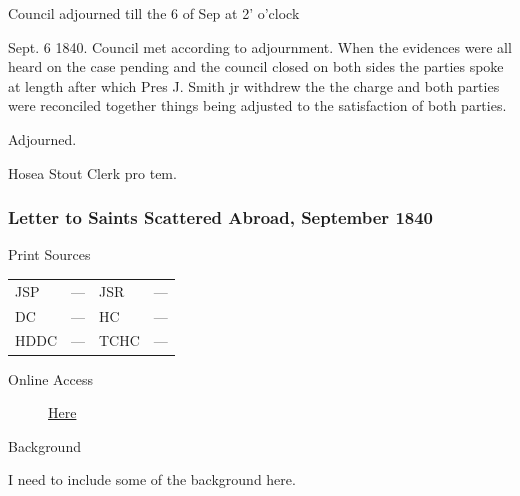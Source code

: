 				Council adjourned till the 6 of Sep at 2' o'clock

				Sept. 6 1840. Council met according to adjournment. When the evidences were all heard on the case pending and the council closed on both sides the parties spoke at length after which Pres J. Smith jr withdrew the the charge and both parties were reconciled together things being adjusted to the satisfaction of both parties.

				Adjourned.

				\begin{tightright}
					Hosea Stout Clerk pro tem.
				\end{tightright}
				
		\subsubsection{Letter to Saints Scattered Abroad, September 1840}
			\label{EMS-1840-JS-SEP-1840}
			
			\begin{description}
				\item[Print Sources]
			\end{description}

			\begin{tabular}{p{0.5in}p{1in}p{0.5in}p{1in}}
				JSP	 	& ---		& JSR 		& --- \\
				DC	 	& ---		& HC 		& --- \\
				HDDC 	& ---		& TCHC 		& --- \\
			\end{tabular}
			
			\begin{description}
				\item[Online Access] \href{https://www.josephsmithpapers.org/paper-summary/letter-to-saints-scattered-abroad-september-1840/1}{Here}
			\end{description}
			
			\begin{description}
				\item[Background]
			\end{description}
			
				I need to include some of the background here.
			
